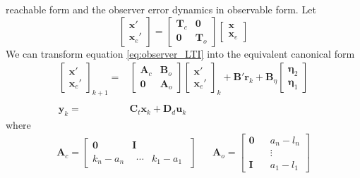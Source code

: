 \documentclass[sigconf]{llncs}
\newcommand{\mat}[1]{\boldsymbol{#1}}
\renewcommand{\vec}[1]{\boldsymbol{#1}}
\begin{document}
reachable form and the observer error dynamics in observable form. Let 
\begin{equation}
\left[\begin{array}{c}\vec{x}'\\ \vec{x}_e'\end{array}\right]=
\left[\begin{array}{cc}\mat{T}_c & \mat{0}\\\mat{0} & \mat{T}_o\end{array}\right] 
\left[\begin{array}{c}\vec{x}\\ \vec{x}_e\end{array}\right]
\end{equation}
We can transform equation \eqref{eq:observer_LTI} into the equivalent canonical form
\begin{align}
\left [\begin{array}{c}\vec{x}'\\ \vec{x}_e' \end{array}\right]_{k+1}
=& \left [\begin{array}{cc}\mat{A}_{c}&\mat{B}_{o}\\ \mat{0}&\mat{A}_{o}\end{array}\right]
\left [\begin{array}{c}\vec{x}'\\ \vec{x}_e' \end{array}\right]_k
+\mat{B}' \vec{r}_k
+\mat{B}_{\eta}\left [\begin{array}{c}\vec{\eta}_2\\ \vec{\eta}_1\end{array}\right]\nonumber\\
\nonumber\\
\vec{y}_k
=& \mat{C}_{t}\vec{x}_k + \mat{D}_{d}\vec{u}_k
\label{eq:observer_LTI_cf}
\end{align}
where
{
\setlength{\abovedisplayskip}{0pt}
\setlength{\belowdisplayskip}{0pt}
%
\begin{align*}
\mat{A}_{c}=\left[
\begin{array}{cc}
\mat{0}&\mat{I}\\
k_n-a_n&\begin{array}{cc}\cdots&k_1-a_1\end{array}
\end{array}\right]&&
\mat{A}_{o}=\left[
\begin{array}{ccc}
\mat{0}&&a_n-l_n\\
&&\vdots\\
\mat{I}&&a_1-l_1
\end{array}\right]
\end{align*}
}
\end{document}
